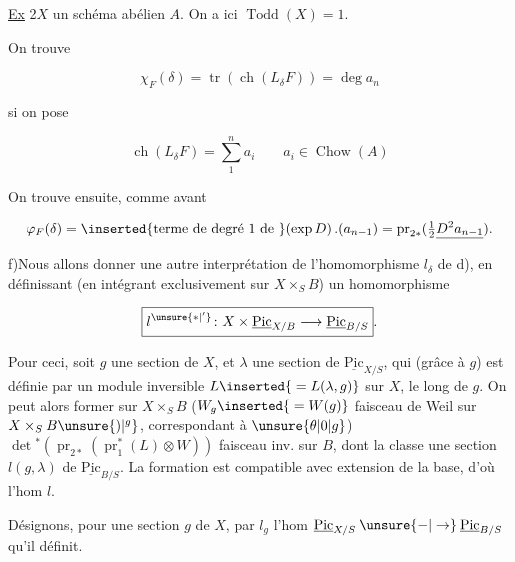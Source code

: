 
\uline{Ex} 2\qquad $X$ un schéma abélien $A$. On a ici $\operatorname{Todd}(X)=1$.

On trouve

\[
\chi_F(\delta)=\operatorname{tr}(\operatorname{ch}(L_\delta F))=\deg a_n
\]

si on pose

\[
\operatorname{ch}(L_\delta F)=\sum_1^n a_i\qquad a_i\in\operatorname{Chow}(A)
\]

On trouve ensuite, comme avant

\[
\varphi_F(\delta)=\inserted{\text{terme de degré 1 de }}(\exp D)\,.(a_{n-1})=\operatorname{pr}_{2*}(\tfrac12\underline{D^2a_{n-1}}).
\]

f)\qquad Nous allons donner une autre interprétation de l'homomorphisme $l_\delta$ de d), en définissant (en intégrant exclusivement sur $X\times_S B$) un homomorphisme

\[
\boxed{l^{\unsure{*|' }}\colon X\times\underline{\mathrm{Pic}}_{X/B}\longrightarrow\underline{\mathrm{Pic}}_{B/S}}.
\]


Pour ceci, soit $g$ une section de $X$, et $\lambda$ une section de $\underline{\mathrm{Pic}}_{X/S}$, qui (grâce à $g$) est définie par un module inversible $L\inserted{{}=L(\lambda,g)}$ sur  $X$,  le long de $g$. On peut alors former sur $X\times_S B$ ($W_g\inserted{{}=W(g)}$ faisceau de Weil sur $X\times_S B\unsure{)|^{g}}$, correspondant à $\unsure{\theta|0|g}$) $\det{}^{*}(\operatorname{pr}_{2*}(\operatorname{pr}_1^{*}(L)\otimes W))$  faisceau inv. sur $B$, dont la classe  une section $l(g,\lambda)$ de $\underline{\mathrm{Pic}}_{B/S}$. La formation est compatible avec extension de la base, d'où l'hom $l$.

Désignons, pour une section $g$ de $X$, par $l_g$ l'hom $\underline{\mathrm{Pic}}_{X/S}\mathbin{\unsure{-|\to}}\underline{\mathrm{Pic}}_{B/S}$ qu'il définit.
